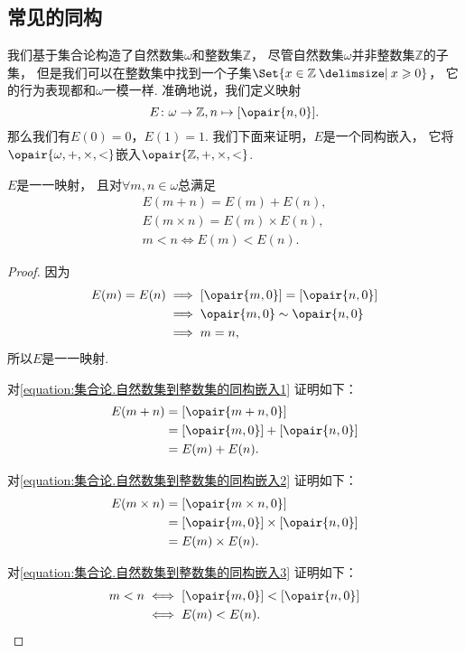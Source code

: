 \subsection{常见的同构}
我们基于集合论构造了自然数集\(\omega\)和整数集\(\mathbb{Z}\)，
尽管自然数集\(\omega\)并非整数集\(\mathbb{Z}\)的子集，
但是我们可以在整数集中找到一个子集\(\Set{ x \in \mathbb{Z} \given x \geqslant 0 }\)，
它的行为表现都和\(\omega\)一模一样.
准确地说，我们定义映射\[
	E\colon \omega\to\mathbb{Z}, n\mapsto[\opair{n,0}].
\]
那么我们有\(E(0)=0\)，\(E(1)=1\).
我们下面来证明，\(E\)是一个同构嵌入，%
它将\(\opair{\omega,+,\times,<}\)嵌入\(\opair{\mathbb{Z},+,\times,<}\).
\begin{theorem}
\(E\)是一一映射，
且对\(\forall m,n\in\omega\)总满足
\begin{gather}
	E(m+n)=E(m)+E(n),
	\label{equation:集合论.自然数集到整数集的同构嵌入1} \\
	E(m \times n)=E(m) \times E(n),
	\label{equation:集合论.自然数集到整数集的同构嵌入2} \\
	m<n \iff E(m)<E(n).
	\label{equation:集合论.自然数集到整数集的同构嵌入3}
\end{gather}
\begin{proof}
因为\begin{align*}
	E(m)=E(n)
	&\implies
	[\opair{m,0}]=[\opair{n,0}] \\
	&\implies
	\opair{m,0}\sim\opair{n,0} \\
	&\implies
	m=n,
\end{align*}
所以\(E\)是一一映射.

对\cref{equation:集合论.自然数集到整数集的同构嵌入1} 证明如下：
\begin{align*}
	E(m+n)
	&= [\opair{m+n,0}] \\
	&= [\opair{m,0}]+[\opair{n,0}] \\
	&= E(m)+E(n).
\end{align*}

对\cref{equation:集合论.自然数集到整数集的同构嵌入2} 证明如下：
\begin{align*}
	E(m \times n)
	&= [\opair{m \times n,0}] \\
	&= [\opair{m,0}]\times[\opair{n,0}] \\
	&= E(m) \times E(n).
\end{align*}

对\cref{equation:集合论.自然数集到整数集的同构嵌入3} 证明如下：
\begin{align*}
	m<n
	&\iff
	[\opair{m,0}]<[\opair{n,0}] \\
	&\iff
	E(m)<E(n).
	\qedhere
\end{align*}
\end{proof}
\end{theorem}

